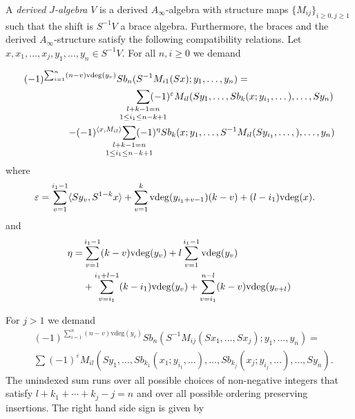 \documentclass[Thesis.tex]{subfiles}
\begin{document}
\begin{defin}\label{derivedJalgebras}
A \emph{derived $J$-algebra} $V$ is a derived $A_\infty$-algebra with structure maps $\{M_{ij}\}_{i\geq 0, j\geq 1}$ such that the shift is $S^{-1}V$ a brace algebra. Furthermore, the braces and the derived $A_\infty$-structure satisfy the following compatibility relations. Let $x, x_1,\dots, x_j, y_1,\dots, y_n\in S^{-1}V$. %
For all $n,i\geq 0$ we demand 


\begin{align*}
(-1)^{\sum_{i=1}^n(n-v)\mathrm{vdeg}(y_v)}Sb_n(&S^{-1}M_{i1}(Sx);y_1,\dots, y_n)=\\
&\underset{\mathclap{1\leq i_1\leq n-k+1}}{\sum_{\mathclap{l+k-1=n}}}(-1)^{\varepsilon}M_{il}(Sy_1,\dots, Sb_{k}(x;y_{i_1},\dots),\dots, Sy_n)\\
-(-1)^{\langle x,M_{il}\rangle}\underset{\mathclap{1\leq i_1\leq n-k+1}}{\sum_{\mathclap{l+k-1=n}}}&(-1)^{\eta} Sb_k(x;y_1,\dots, S^{-1}M_{il}(Sy_{i_1},\dots,), \dots, y_n)
\end{align*}
where
\begin{align*}
\varepsilon = \sum_{v=1}^{i_1-1}\langle Sy_v,S^{1-k}x\rangle&+\sum_{v=1}^{k}\mathrm{vdeg}(y_{i_1+v-1})(k-v)+(l-i_1)\mathrm{vdeg}(x).
\end{align*}
and
\begin{align*}
\eta=& \sum_{v=1}^{i_1-1}(k-v)\mathrm{vdeg}(y_v)+l\sum_{v=1}^{i_1-1}\mathrm{vdeg}(y_v)\\
&+\sum_{v=i_1}^{i_1+l-1}(k-i_1)\mathrm{vdeg}(y_v)+\sum_{v=i_1}^{n-l}(k-v)\mathrm{vdeg}(y_{v+l})
\end{align*}

For $j>1$ we demand
\begin{align*}
&(-1)^{\sum_{i=1}^n(n-v)\mathrm{vdeg}(y_v)}Sb_n(S^{-1}M_{ij}(Sx_1,\dots, Sx_j);y_1,\dots, y_n)=\\
&\sum(-1)^{\varepsilon}M_{il}(Sy_1,\dots, Sb_{k_1}(x_1;y_{i_1},\dots),\dots, Sb_{k_j}(x_j;y_{i_j},\dots),\dots, Sy_n).
\end{align*}
The unindexed sum runs over all possible choices of non-negative integers that satisfy $l+k_1+\cdots+k_j-j=n$ and over all possible ordering preserving insertions. The right hand side sign is given by 


\end{defin}
\end{document}
